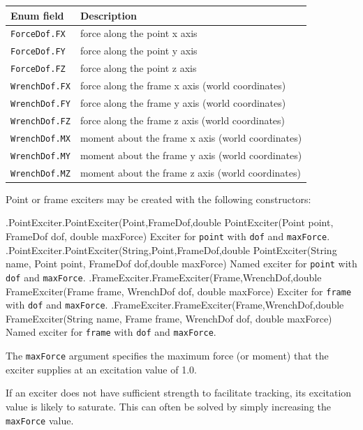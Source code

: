 \begin{center}
\begin{tabular}{|ll|}
\hline
Enum field & Description\\
\hline
{\tt ForceDof.FX} & force along the point x axis \\
{\tt ForceDof.FY} & force along the point y axis \\
{\tt ForceDof.FZ} & force along the point z axis \\
\hline
{\tt WrenchDof.FX} & force along the frame x axis (world coordinates) \\
{\tt WrenchDof.FY} & force along the frame y axis (world coordinates) \\
{\tt WrenchDof.FZ} & force along the frame z axis (world coordinates) \\
{\tt WrenchDof.MX} & moment about the frame x axis (world coordinates) \\
{\tt WrenchDof.MY} & moment about the frame y axis (world coordinates) \\
{\tt WrenchDof.MZ} & moment about the frame z axis (world coordinates) \\
\hline
\end{tabular}
\end{center}

Point or frame exciters may be created with the following constructors:
%
\begin{methodtable}{0.6}{0.4}
\midline
%
\methodentry
{\inverse.PointExciter.PointExciter(Point,FrameDof,double}%
{PointExciter(Point point, FrameDof dof, double maxForce)}%
{Exciter for {\tt point} with {\tt dof} and {\tt maxForce}.}%
%
\methodentry
{\inverse.PointExciter.PointExciter(String,Point,FrameDof,double}%
{PointExciter(String name, Point point, FrameDof dof,\brh double maxForce)}%
{Named exciter for {\tt point} with {\tt dof} and {\tt maxForce}.}%
%
\methodspace{0.5em}%
%
\methodentry
{\inverse.FrameExciter.FrameExciter(Frame,WrenchDof,double}%
{FrameExciter(Frame frame, WrenchDof dof, double maxForce)}%
{Exciter for {\tt frame} with {\tt dof} and {\tt maxForce}.}%
%
\methodentry
{\inverse.FrameExciter.FrameExciter(Frame,WrenchDof,double}%
{FrameExciter(String name, Frame frame, WrenchDof dof, \brh double maxForce)}%
{Named exciter for {\tt frame} with {\tt dof} and {\tt maxForce}.}%
%
\midline
\end{methodtable}
%
The {\tt maxForce} argument specifies the maximum force (or moment) that the
exciter supplies at an excitation value of 1.0.
%
\begin{sideblock}
If an exciter does not have sufficient strength to facilitate tracking, its
excitation value is likely to saturate. This can often be solved
by simply increasing the {\tt maxForce} value.
\end{sideblock}

